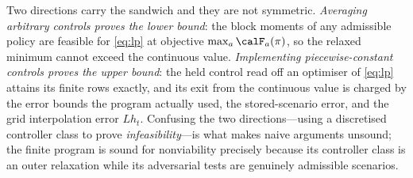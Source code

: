 Two directions carry the sandwich and they are not symmetric. \emph{Averaging arbitrary controls proves the lower bound}: the block moments of any admissible policy are feasible for \eqref{eq:lp} at objective $\max_a\calF_a(\pi)$, so the relaxed minimum cannot exceed the continuous value. \emph{Implementing piecewise-constant controls proves the upper bound}: the held control read off an optimiser of \eqref{eq:lp} attains its finite rows exactly, and its exit from the continuous value is charged by the error bounds the program actually used, the stored-scenario error, and the grid interpolation error $Lh_t$. Confusing the two directions---using a discretised controller class to prove \emph{infeasibility}---is what makes naive arguments unsound; the finite program is sound for nonviability precisely because its controller class is an outer relaxation while its adversarial tests are genuinely admissible scenarios.
